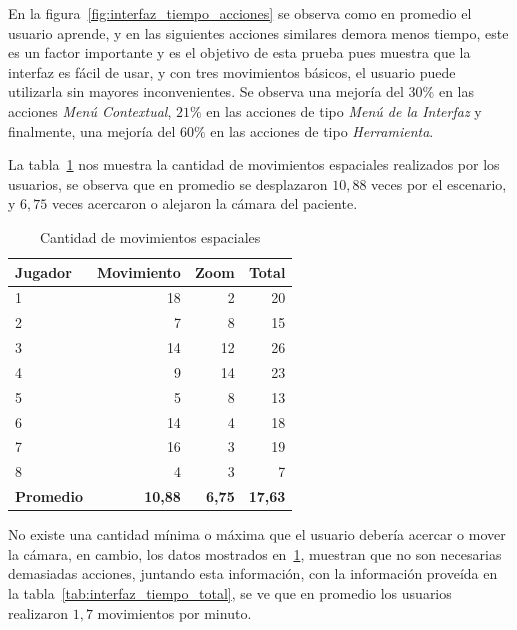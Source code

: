 En la figura~\ref{fig:interfaz_tiempo_acciones} se observa como en promedio el
usuario aprende, y en las siguientes acciones similares demora menos tiempo,
este es un factor importante y es el objetivo de esta prueba pues muestra que la
interfaz es fácil de usar, y con tres movimientos básicos, el usuario puede
utilizarla sin mayores inconvenientes. Se observa una mejoría del $30\%$ en las
acciones \emph{Menú Contextual}, $21\%$ en las acciones de tipo \emph{Menú de la
    Interfaz} y finalmente, una mejoría del $60\%$ en las acciones de tipo
\emph{Herramienta}.


La tabla~\ref{tab:interfaz_cantidad_espaciales} nos muestra la cantidad de
movimientos espaciales realizados por los usuarios, se observa que en promedio
se desplazaron $10,88$ veces por el escenario, y $6,75$ veces acercaron o
alejaron la cámara del paciente.


\begin{table}[H]
\centering
\begin{tabular}{lrrr}
\toprule
\textbf{Jugador}  & \textbf{Movimiento} & \textbf{Zoom} & \textbf{Total} \\
\midrule
1        & 18         & 2    & 20 \\
2        & 7          & 8    & 15 \\
3        & 14         & 12   & 26 \\
4        & 9          & 14   & 23 \\
5        & 5          & 8    & 13 \\
6        & 14         & 4    & 18 \\
7        & 16         & 3    & 19 \\
8        & 4          & 3    &  7 \\
\midrule
\textbf{Promedio} & \textbf{10,88}      & \textbf{6,75} & \textbf{17,63} \\
\bottomrule
\end{tabular}
\caption{Cantidad de movimientos espaciales}
\label{tab:interfaz_cantidad_espaciales}
\end{table}

No existe una cantidad mínima o máxima que el usuario debería acercar o mover la
cámara, en cambio, los datos mostrados en~\ref{tab:interfaz_cantidad_espaciales},
muestran que no son necesarias demasiadas acciones, juntando esta información,
con la información proveída en la tabla~\ref{tab:interfaz_tiempo_total}, se ve
que en promedio los usuarios realizaron $1,7$ movimientos por minuto.


